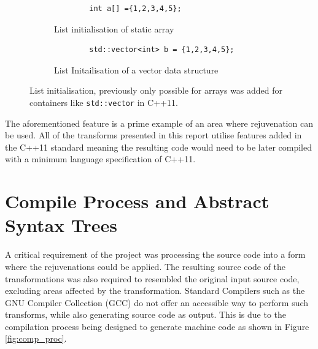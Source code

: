 \documentclass[bsc,frontabs,singlespacing,twoside,parskip,deptreport]{infthesis}
\begin{document}
\begin{figure}[H]
    \centering
    \begin{subfigure}[b]{0.5\textwidth}
        \begin{verbatim}
        int a[] ={1,2,3,4,5};
        \end{verbatim}
        \caption{List initialisation of static array}
        \vspace{0.2cm}
        \label{fig:vec-list-a}
    \end{subfigure}
    
    \begin{subfigure}[b]{0.5\textwidth}
        \begin{verbatim}
        std::vector<int> b = {1,2,3,4,5};
        \end{verbatim}
        \caption{List Initailisation of a vector data structure}
        \label{fig:vec-list-b}
    \end{subfigure}
    
    \caption{List initialisation, previously only possible for arrays was added for containers like \texttt{std::vector} in C++11.}
    \label{fig:vec-list}
\end{figure}

The aforementioned feature is a prime example of an area where rejuvenation can be used. All of the transforms presented in this report utilise features added in the C++11 standard meaning the resulting code would need to be later compiled with a minimum language specification of C++11. 


\section{Compile Process and Abstract Syntax Trees}
A critical requirement of the project was processing the source code into a form where the rejuvenations could be applied. The resulting source code of the transformations was also required to resembled the original input source code, excluding areas affected by the transformation. Standard Compilers such as the GNU Compiler Collection (GCC) \cite{GCC} do not offer an accessible way to perform such transforms, while also generating source code as output. This is due to the compilation process being designed to generate machine code as shown in Figure \ref{fig:comp_proc}.
\end{document}
